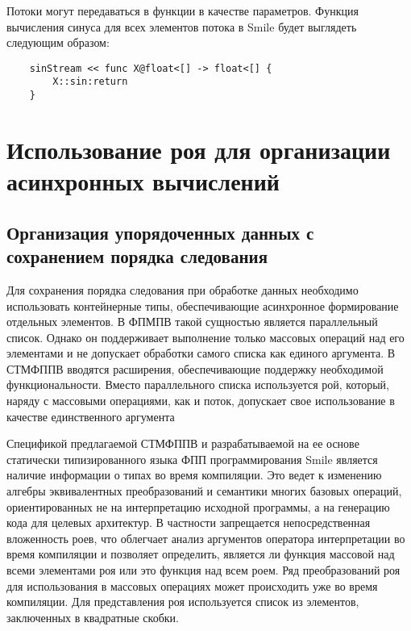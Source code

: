 Потоки могут передаваться в функции в качестве параметров. Функция вычисления синуса для всех элементов потока в Smile будет выглядеть следующим образом:
\begin{verbatim}
    sinStream << func X@float<[] -> float<[] {
        X::sin:return
    }
\end{verbatim}


\section{Использование роя для организации асинхронных вычислений}

\subsection{Организация упорядоченных данных с сохранением порядка следования}

Для сохранения порядка следования при обработке данных необходимо использовать контейнерные типы, обеспечивающие асинхронное формирование отдельных элементов. В ФПМПВ такой сущностью является параллельный список. Однако он поддерживает выполнение только массовых операций над его элементами и не допускает обработки самого списка как единого аргумента. В СТМФППВ вводятся расширения, обеспечивающие поддержку необходимой функциональности. Вместо параллельного списка используется рой, который, наряду с массовыми операциями, как и поток, допускает свое использование в качестве единственного аргумента %


Спецификой предлагаемой СТМФППВ и разрабатываемой на ее основе статически типизированного языка ФПП программирования Smile является наличие информации о типах во время компиляции. Это ведет к изменению алгебры эквивалентных преобразований и семантики многих базовых операций, ориентированных не на интерпретацию исходной программы, а на генерацию кода для целевых архитектур. В частности запрещается непосредственная вложенность роев, что облегчает анализ аргументов оператора интерпретации во время компиляции и позволяет определить, является ли функция массовой над всеми элементами роя или это функция над всем роем. Ряд преобразований роя для использования в массовых операциях может происходить уже во время компиляции. Для представления роя используется список из элементов, заключенных в квадратные скобки.

